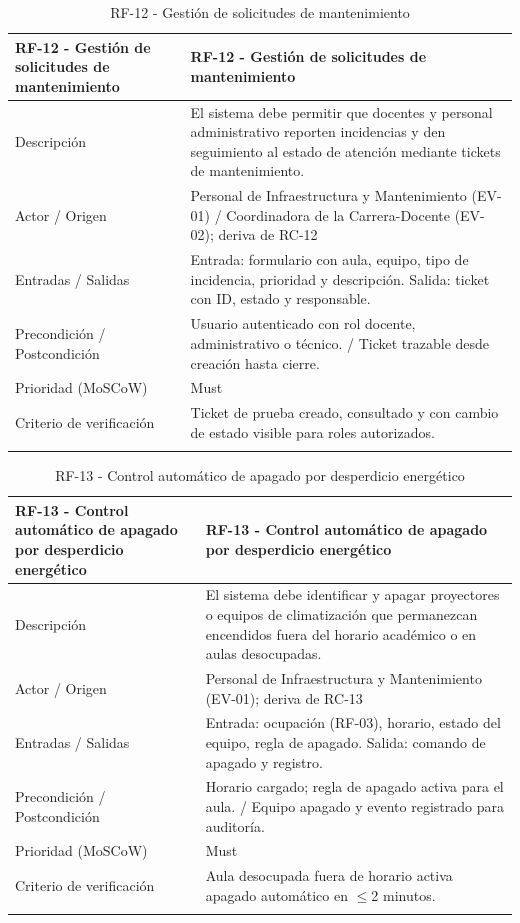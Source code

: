 \begingroup
\small
\begin{longtable}{|p{7.8cm}|p{7.8cm}|}
\hline
RF-12 - Gestión de solicitudes de mantenimiento & RF-12 - Gestión de solicitudes de mantenimiento \\ \hline
Descripción & El sistema debe permitir que docentes y personal administrativo reporten incidencias y den seguimiento al estado de atención mediante tickets de mantenimiento. \\ \hline
Actor / Origen & Personal de Infraestructura y Mantenimiento (EV-01) / Coordinadora de la Carrera-Docente (EV-02); deriva de RC-12 \\ \hline
Entradas / Salidas & Entrada: formulario con aula, equipo, tipo de incidencia, prioridad y descripción. Salida: ticket con ID, estado y responsable. \\ \hline
Precondición / Postcondición & Usuario autenticado con rol docente, administrativo o técnico. / Ticket trazable desde creación hasta cierre. \\ \hline
Prioridad (MoSCoW) & Must \\ \hline
Criterio de verificación & Ticket de prueba creado, consultado y con cambio de estado visible para roles autorizados. \\ \hline
\caption{RF-12 - Gestión de solicitudes de mantenimiento}
\end{longtable}
\endgroup

\begingroup
\small
\begin{longtable}{|p{7.8cm}|p{7.8cm}|}
\hline
RF-13 - Control automático de apagado por desperdicio energético & RF-13 - Control automático de apagado por desperdicio energético \\ \hline
Descripción & El sistema debe identificar y apagar proyectores o equipos de climatización que permanezcan encendidos fuera del horario académico o en aulas desocupadas. \\ \hline
Actor / Origen & Personal de Infraestructura y Mantenimiento (EV-01); deriva de RC-13 \\ \hline
Entradas / Salidas & Entrada: ocupación (RF-03), horario, estado del equipo, regla de apagado. Salida: comando de apagado y registro. \\ \hline
Precondición / Postcondición & Horario cargado; regla de apagado activa para el aula. / Equipo apagado y evento registrado para auditoría. \\ \hline
Prioridad (MoSCoW) & Must \\ \hline
Criterio de verificación & Aula desocupada fuera de horario activa apagado automático en $\leq$2 minutos. \\ \hline
\caption{RF-13 - Control automático de apagado por desperdicio energético}
\end{longtable}
\endgroup

